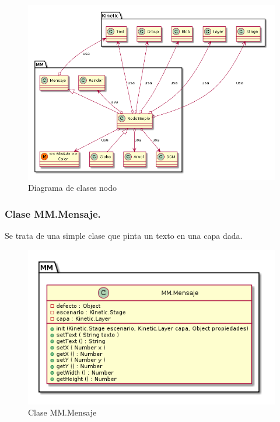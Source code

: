 \begin{figure}[tbph]
\centering
\includegraphics[width=\linewidth]{imagenes/diagrama-clases-mm-render}
\caption{Diagrama de clases nodo}
\label{fig:diagrama-clases-mm-render}
\end{figure}


\subsubsection{Clase MM.Mensaje.}
Se trata de una simple clase que pinta un texto en una capa dada. 

\begin{figure}[tbph]
\centering
\includegraphics[width=0.7\linewidth]{imagenes/diagrama-clase-mm-mensaje}
\caption{Clase MM.Mensaje}
\label{fig:diagrama-clase-mm-mensaje}
\end{figure}


